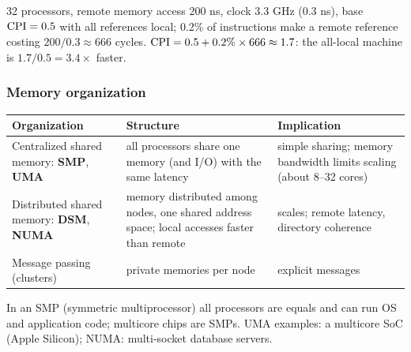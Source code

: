 \begin{eg}
32 processors, remote memory access 200 ns, clock 3.3 GHz (0.3 ns), base $\mathrm{CPI}=0.5$
with all references local; 0.2\% of instructions make a remote reference costing
$200/0.3\approx666$ cycles. $\mathrm{CPI}=0.5+0.2\%\times666\approx1.7$: the all-local
machine is $1.7/0.5=3.4\times$ faster.
\end{eg}

\subsubsection{Memory organization}
\begin{center}
\small
\begin{tabular}{@{}P{3.6cm}P{5.2cm}P{5.2cm}@{}}
\toprule
Organization & Structure & Implication \\
\midrule
Centralized shared memory: \textbf{SMP}, \textbf{UMA} & all processors share one
memory (and I/O) with the same latency & simple sharing; memory bandwidth limits
scaling (about 8--32 cores) \\
Distributed shared memory: \textbf{DSM}, \textbf{NUMA} & memory distributed among
nodes, one shared address space; local accesses faster than remote & scales; remote
latency, directory coherence \\
Message passing (clusters) & private memories per node & explicit messages \\
\bottomrule
\end{tabular}
\end{center}
In an SMP (symmetric multiprocessor) all processors are equals and can run OS and
application code; multicore chips are SMPs. UMA examples: a multicore SoC (Apple
Silicon); NUMA: multi-socket database servers.

